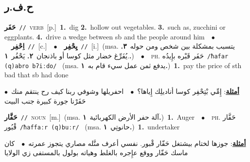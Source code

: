 \documentclass[10pt,a4paper,twoside]{article} %
\begin{document}
\begin{multicols}{2}
\vspace{-3mm}
\subsection*{\color{blue}\foreignlanguage{arabic}{ح.ف.ر}\color{blue}{}} 

{\setlength\topsep{0pt}\textbf{\foreignlanguage{arabic}{حَفَر}}\ {\color{gray}\texttt{//}\color{black}}\ \textsc{verb}\ [p.]\ \textbf{1.}~dig  \textbf{2.}~hollow out vegetables.  \textbf{3.}~such as, zucchini or eggplants.  \textbf{4.}~drive a wedge between sb and the people around him\ \ $\bullet$\ \ \setlength\topsep{0pt}\textbf{\foreignlanguage{arabic}{اِحْفِر}}\ {\color{gray}\texttt{//}\color{black}}\ [c.]\ \ $\bullet$\ \ \setlength\topsep{0pt}\textbf{\foreignlanguage{arabic}{يِحْفِر}}\ {\color{gray}\texttt{//}\color{black}}\ [i.]\ \color{gray}(msa. \foreignlanguage{arabic}{يتسبب بمشكلة بين شخص ومن حوله}~\foreignlanguage{arabic}{\textbf{٣.}}  .\foreignlanguage{arabic}{يُفَرِّغ خضار مثل كوسا أو باذنجان}~\foreignlanguage{arabic}{\textbf{٢.}}  \foreignlanguage{arabic}{يَحْفُر}~\foreignlanguage{arabic}{\textbf{١.}})\color{black}\ \ $\bullet$\ \ \textsc{ph.} \color{gray} \foreignlanguage{arabic}{حَفَر قَبْره بإِيدُه}\color{black}\ {\color{gray}\texttt{/{\sffamily ħafar (q)abro bʔiːdo}/}\color{black}}\ \color{gray} (msa. \foreignlanguage{arabic}{يدفع ثمن عمل سيء قام به}~\foreignlanguage{arabic}{\textbf{١.}})\color{black}\ \textbf{1.}~pay the price of sth bad that sb had done\  \begin{flushright}\color{gray}\foreignlanguage{arabic}{\textbf{\underline{\foreignlanguage{arabic}{أمثلة}}}: إِمِّي بْتِحْفِر كوسا أناديلِك إِياها؟\ $\bullet$\ \  احفريلها وشوفي ربنا كيف رح ينتقم منك\ $\bullet$\ \  حَفَرْنا جورة كبيرة جنب البيت}\end{flushright}\color{black}} \vspace{2mm}

{\setlength\topsep{0pt}\textbf{\foreignlanguage{arabic}{حَفَّار}}\ {\color{gray}\texttt{//}\color{black}}\ \textsc{noun}\ [m.]\ \color{gray}(msa. \foreignlanguage{arabic}{آلة حفر الأرض الكهربائية}~\foreignlanguage{arabic}{\textbf{١.}})\color{black}\ \textbf{1.}~Auger\ \ $\bullet$\ \ \textsc{ph.} \color{gray} \foreignlanguage{arabic}{حَفَّار قْبُور}\color{black}\ {\color{gray}\texttt{/{\sffamily ħaffaːr (q)buːr}/}\color{black}}\ \color{gray} (msa. \foreignlanguage{arabic}{حانوتِي}~\foreignlanguage{arabic}{\textbf{١.}})\color{black}\ \textbf{1.}~undertaker\  \begin{flushright}\color{gray}\foreignlanguage{arabic}{\textbf{\underline{\foreignlanguage{arabic}{أمثلة}}}: جوزها لختام بيشتغل حَفّار قْبور. نفسي أعرف منَّله مصاري يتجوز عمرته\ $\bullet$\ \  كان ماسك حَفّار ووقع عإِجره بالغلط وهياته بولول بالمستفى زي الولايا}\end{flushright}\color{black}} \vspace{2mm}


\end{multicols}
\end{document}
